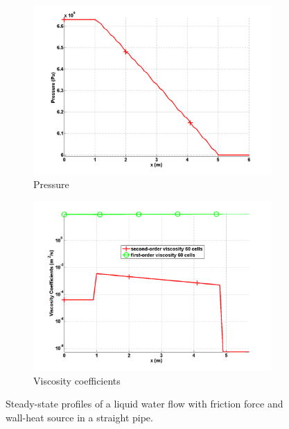 \begin{figure}[H]
        \begin{subfigure}[b]{0.495\textwidth}
                \centering
                \includegraphics[width=\textwidth]{figures/liquid_friction_heat_pressure_source_terms.png}
                \caption{Pressure}
                \label{fig:1d-liquid-friction-heat-pressure-sct3}
        \end{subfigure}
        \begin{subfigure}[b]{0.495\textwidth}
                \centering
                \includegraphics[width=\textwidth]{figures/liquid_friction_heat_viscosity_source_terms.png}
                \caption{Viscosity coefficients}
                \label{fig:1d-liquid-friction-heat-visc-sct3}
        \end{subfigure}
        \caption{Steady-state profiles of a liquid water flow with friction force and wall-heat source in a straight pipe.}
				\label{fig:1d-liquid-friction-heat-sct3}
\end{figure}
